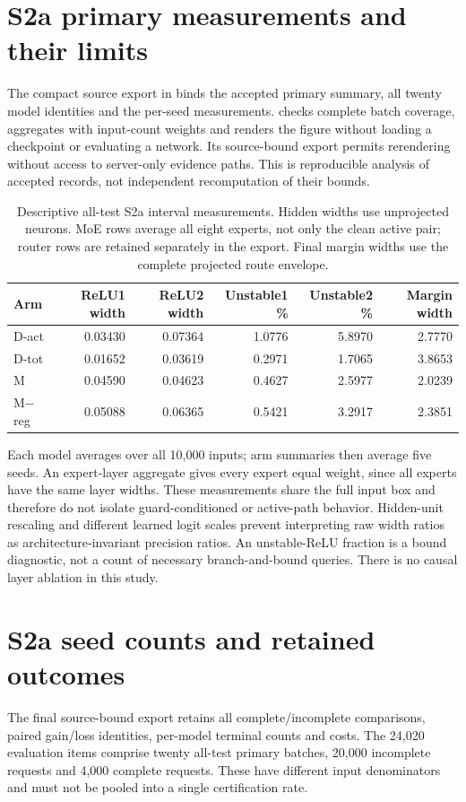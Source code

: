 \section{S2a primary measurements and their limits}
\label{app:s2widths}
The compact source export in  binds the
accepted primary summary, all twenty model identities and the per-seed
measurements.  checks complete batch
coverage, aggregates with input-count weights and renders the figure without
loading a checkpoint or evaluating a network. Its source-bound export permits
rerendering without access to server-only evidence paths. This is reproducible
analysis of accepted records, not independent recomputation of their bounds.

\begin{table}[ht]
\centering\small
\begin{tabular}{lrrrrr}
\toprule
Arm & ReLU1 width & ReLU2 width & Unstable1 \% & Unstable2 \% & Margin width\\
\midrule
D-act &0.03430&0.07364&1.0776&5.8970&2.7770\\
D-tot &0.01652&0.03619&0.2971&1.7065&3.8653\\
M &0.04590&0.04623&0.4627&2.5977&2.0239\\
M$-$reg &0.05088&0.06365&0.5421&3.2917&2.3851\\
\bottomrule
\end{tabular}
\caption{Descriptive all-test S2a interval measurements. Hidden widths use
unprojected neurons. MoE rows average all eight experts, not only the clean
active pair; router rows are retained separately in the export. Final margin
widths use the complete projected route envelope.}
\end{table}

Each model averages over all 10,000 inputs; arm summaries then average five
seeds. An expert-layer aggregate gives every expert equal weight, since all
experts have the same layer widths. These measurements share the full input
box and therefore do not isolate guard-conditioned or active-path behavior.
Hidden-unit rescaling and different learned logit scales prevent interpreting
raw width ratios as architecture-invariant precision ratios. An unstable-ReLU
fraction is a bound diagnostic, not a count of necessary branch-and-bound
queries. There is no causal layer ablation in this study.

\section{S2a seed counts and retained outcomes}
\label{app:s2final}
The final source-bound export  retains all
complete/incomplete comparisons, paired gain/loss identities, per-model
terminal counts and costs. The 24,020 evaluation items comprise twenty
all-test primary batches, 20,000 incomplete requests and 4,000 complete
requests. These have different input denominators and must not be pooled
into a single certification rate.

